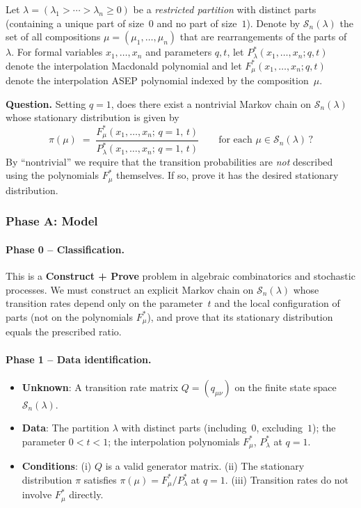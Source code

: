 
Let $\lambda = (\lambda_1 > \cdots > \lambda_n \geq 0)$ be a
\emph{restricted partition} with distinct parts (containing a unique part
of size~$0$ and no part of size~$1$).
Denote by $\mathcal{S}_n(\lambda)$ the set of all compositions
$\mu = (\mu_1, \ldots, \mu_n)$ that are rearrangements of the parts
of~$\lambda$.
For formal variables $x_1, \ldots, x_n$ and parameters $q, t$, let
$P^*_\lambda(x_1, \ldots, x_n; q, t)$ denote the interpolation Macdonald
polynomial and let $F^*_\mu(x_1, \ldots, x_n; q, t)$ denote the
interpolation ASEP polynomial indexed by the composition~$\mu$.

\textbf{Question.} Setting $q = 1$, does there exist a nontrivial Markov
chain on $\mathcal{S}_n(\lambda)$ whose stationary distribution is given by
\[
\pi(\mu) \;=\;
\frac{F^*_\mu(x_1, \ldots, x_n;\, q{=}1,\, t)}
     {P^*_\lambda(x_1, \ldots, x_n;\, q{=}1,\, t)}
\qquad
\text{for each } \mu \in \mathcal{S}_n(\lambda)\,?
\]
By ``nontrivial'' we require that the transition probabilities are
\emph{not} described using the polynomials $F^*_\mu$ themselves.
If so, prove it has the desired stationary distribution.


\subsubsection*{Phase A: Model}

\paragraph{Phase 0 -- Classification.}
This is a \textbf{Construct + Prove} problem in algebraic combinatorics
and stochastic processes. We must construct an explicit Markov chain on
$\mathcal{S}_n(\lambda)$ whose transition rates depend only on the
parameter~$t$ and the local configuration of parts (not on the
polynomials $F^*_\mu$), and prove that its stationary distribution
equals the prescribed ratio.

\paragraph{Phase 1 -- Data identification.}
\begin{itemize}
\item \textbf{Unknown}: A transition rate matrix $Q = (q_{\mu\nu})$ on the
  finite state space $\mathcal{S}_n(\lambda)$.
\item \textbf{Data}: The partition $\lambda$ with distinct parts
  (including~$0$, excluding~$1$); the parameter $0 < t < 1$; the interpolation
  polynomials $F^*_\mu$, $P^*_\lambda$ at $q = 1$.
\item \textbf{Conditions}: (i) $Q$ is a valid generator matrix.
  (ii) The stationary distribution $\pi$ satisfies
  $\pi(\mu) = F^*_\mu / P^*_\lambda$ at $q=1$.
  (iii) Transition rates do not involve $F^*_\mu$ directly.
\end{itemize}


